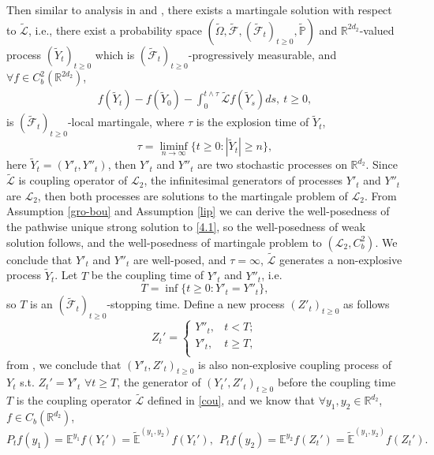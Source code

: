 \documentclass[11pt,reqno]{amsart}
\numberwithin{equation}{section}
\newcommand{\R}{\mathbb{R}}
\begin{document}

Then similar to analysis in \cite{DW} and \cite[Section 2.2]{JW2}, %
there exists a martingale solution with respect to $\widetilde{\mathcal{L}}$, i.e., there exist a probability space
$(\widetilde{\Omega}, \widetilde{\mathscr{F}},
(\widetilde{\mathscr{F}}_t)_{t\ge0}, \widetilde{\mathbb{P}})$ and
$\R^{2d_2}$-valued process $(\widetilde{Y}_t)_{t\ge0}$ which is
$(\widetilde{\mathscr{F}}_t)_{t\ge0}$-progressively measurable, and $\forall f\in C_b^2(\R^{2d_2})$,
\begin{align*}
f(\widetilde{Y}_t)-f(\widetilde{Y}_0)-\int_0^{t\wedge \tau} \widetilde{\mathcal{L}}f(\widetilde{Y}_s)ds,\ t\ge 0,
\end{align*}
is $(\widetilde{\mathscr{F}}_t)_{t\ge0}$-local martingale, where
$\tau$ is the explosion time of $\widetilde{Y}_t$, 
$$\tau=\liminf_{n\to\infty}\{t\ge0: |\widetilde{Y}_t|\ge n\},$$
here $\widetilde{Y}_t=(Y'_t,Y''_t)$, then $Y'_t$ and $Y''_t$ are two stochastic processes
on $\R^{d_2}$. Since $\widetilde{\mathcal{L}}$ is  coupling operator of $\mathcal{L}_2$,
the infinitesimal generators of processes $Y'_t$ and
$Y''_t$ are $\mathcal{L}_2$, then both processes are
solutions to the martingale problem of $\mathcal{L}_2$. From Assumption \ref{gro-bou} and Assumption \ref{lip} we can derive the well-posedness of the pathwise unique strong solution to \eqref{4.1}, so the well-posedness of weak solution follows, and the well-posedness of  martingale problem to $(\mathcal{L}_2, C^2_b)$. We conclude  that $Y'_t$ and $Y''_t$ are well-posed, and $\tau=\infty$, $\widetilde{\mathcal{L}}$ generates a non-explosive process $\widetilde{Y}_t$.
Let $T$ be the coupling time of $Y'_t$ and $Y''_t$, i.e.
$$T=\inf\{t\ge0: Y'_t=Y''_t\},$$
so $T$ is an $(\widetilde{\mathscr{F}}_t)_{t\geq 0}$-stopping time. Define
a new process $(Z'_t)_{t\ge0}$ as follows
$$Z_t'=
\begin{cases}
	Y''_t, & t< T;\\
	Y'_t, & t\ge T,\\
\end{cases}
$$
from \cite[Section 2.2]{JW2}, we conclude that
$(Y'_t,Z'_t)_{t\geq0}$ is also non-explosive coupling process of
$Y_t$ s.t. $Z_t'=Y'_t$ $\forall t\ge T$,
the generator of $(Y_t',Z'_t)_{t\ge0}$ before the coupling time $T$
is  the coupling operator $\widetilde{\mathcal{L}}$ defined in \eqref{cou}, and we know that
$\forall y_1,y_2\in\R^{d_2}$, $f\in C_b(\R^{d_2})$,
$$P_t f(y_1)={\mathbb{E}^{y_1}f(Y_t')}=\widetilde{{\mathbb{E}}}^{(y_1,y_2)}f(Y_t'),\ \ P_t f(y_2)={\mathbb{E}^{y_2}f(Z_t')}=\widetilde{{\mathbb{E}}}^{(y_1,y_2)}f(Z_t').$$
\end{document}
